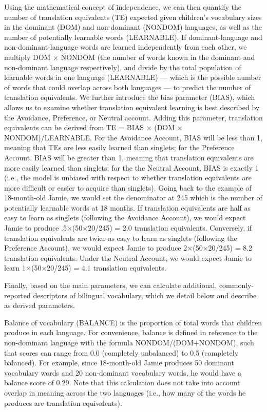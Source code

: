 \documentclass[
  english,
  ,man,floatsintext]{apa6}
\begin{document}
Using the mathematical concept of independence, we can then quantify the number of translation equivalents (TE) expected given children's vocabulary sizes in the dominant (DOM) and non-dominant (NONDOM) languages, as well as the number of potentially learnable words (LEARNABLE). If dominant-language and non-dominant-language words are learned independently from each other, we multiply DOM × NONDOM (the number of words known in the dominant and non-dominant language respectively), and divide by the total population of learnable words in one language (LEARNABLE) --- which is the possible number of words that could overlap across both languages --- to predict the number of translation equivalents.
We further introduce the bias parameter (BIAS), which allows us to examine whether translation equivalent learning is best described by the Avoidance, Preference, or Neutral account. Adding this parameter, translation equivalents can be derived from TE = BIAS × (DOM × NONDOM)/LEARNABLE. For the Avoidance Account, BIAS will be less than 1, meaning that TEs are less easily learned than singlets; for the Preference Account, BIAS will be greater than 1, meaning that translation equivalents are more easily learned than singlets; for the the Neutral Account, BIAS is exactly 1 (i.e., the model is unbiased with respect to whether translation equivalents are more difficult or easier to acquire than singlets). Going back to the example of 18-month-old Jamie, we would set the denominator at 245 which is the number of potentially learnable words at 18 months. If translation equivalents are half as easy to learn as singlets (following the Avoidance Account), we would expect Jamie to produce .5×(50×20/245) = 2.0 translation equivalents. Conversely, if translation equivalents are twice as easy to learn as singlets (following the Preference Account), we would expect Jamie to produce 2×(50×20/245) = 8.2 translation equivalents. Under the Neutral Account, we would expect Jamie to learn 1×(50×20/245) = 4.1 translation equivalents.

Finally, based on the main parameters, we can calculate additional, commonly-reported descriptors of bilingual vocabulary, which we detail below and describe as derived parameters.

Balance of vocabulary (BALANCE) is the proportion of total words that children produce in each language. For convenience, balance is defined in reference to the non-dominant language with the formula NONDOM/(DOM+NONDOM), such that scores can range from 0.0 (completely unbalanced) to 0.5 (completely balanced). For example, since 18-month-old Jamie produces 50 dominant vocabulary words and 20 non-dominant vocabulary words, he would have a balance score of 0.29. Note that this calculation does not take into account overlap in meaning across the two languages (i.e., how many of the words he produces are translation equivalents).
\end{document}
